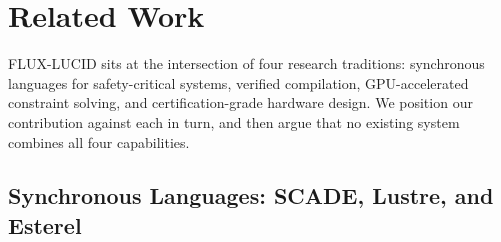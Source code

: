 \documentclass[sigplan,review,anonymous]{acmart}
\begin{document}
%
%
%
%
%



\section{Related Work}
\label{sec:related}

FLUX-LUCID sits at the intersection of four research traditions:
synchronous languages for safety-critical systems, verified compilation,
GPU-accelerated constraint solving, and certification-grade hardware design.
We position our contribution against each in turn, and then argue that no
existing system combines all four capabilities.

\subsection{Synchronous Languages: SCADE, Lustre, and Esterel}
\label{sec:related-synchronous}
\end{document}

